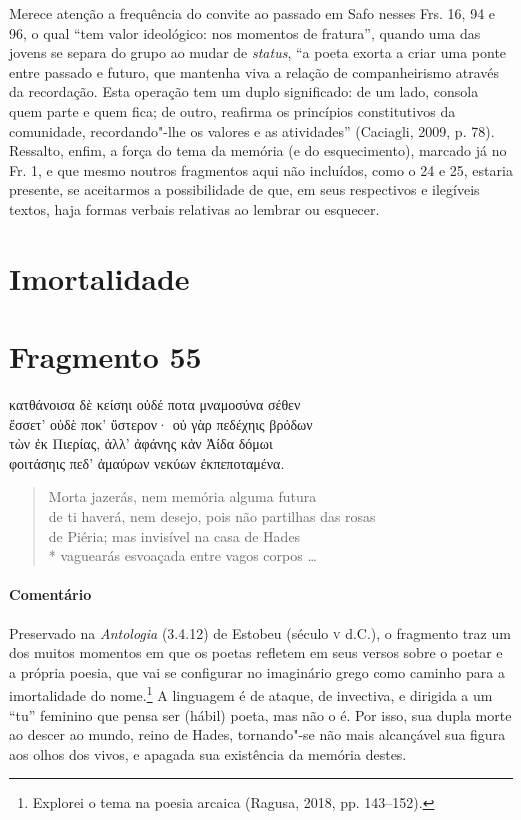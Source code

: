 {{Merece atenção a frequência do convite ao passado em Safo nesses Frs. 16, 94 e 96, o qual “tem valor ideológico: nos momentos de fratura”, quando uma das jovens se separa do grupo ao mudar de \textit{status}, “a poeta exorta a criar uma ponte entre passado e futuro, que mantenha viva a relação de companheirismo através da recordação. Esta operação tem um duplo significado: de um lado, consola quem parte e quem fica; de outro, reafirma os princípios constitutivos da comunidade, recordando"-lhe os valores e as atividades” (Caciagli, 2009, p. 78).
Ressalto, enfim, a força do tema da memória (e do esquecimento), marcado já no Fr. 1, e que mesmo noutros fragmentos aqui não incluídos, como o 24 e 25, estaria presente, se aceitarmos a possibilidade de que, em seus respectivos e ilegíveis textos, haja formas verbais relativas ao lembrar ou esquecer.
}





\pagebreak
\section{Imortalidade}
\section{Fragmento 55}

\begin{gkverse}
κατθάνοισα δὲ κείσηι οὐδέ ποτα μναμοσύνα σέθεν\\
ἔσσετ’ οὐδὲ \dagger{}ποκ’\dagger{} ὔστερον· οὐ γὰρ πεδέχηις βρόδων\\
τὼν ἐκ Πιερίας, ἀλλ’ ἀφάνης κἀν Ἀίδα δόμωι\\
φοιτάσηις πεδ’ ἀμαύρων νεκύων ἐκπεποταμένα.
\end{gkverse}

\begin{verse}
Morta jazerás, nem memória alguma futura\\
de ti haverá, nem desejo, pois não partilhas das rosas\\
de Piéria; mas invisível na casa de Hades\\*
vaguearás esvoaçada entre vagos corpos \ldots{}
\end{verse}

{\paragraph{Comentário} Preservado na \textit{Antologia} (3.4.12) de Estobeu (século \textsc{v} d.C.), o fragmento traz um dos muitos momentos em que os poetas refletem em seus versos
sobre o poetar e a própria poesia, que vai se configurar no imaginário grego
como caminho para a imortalidade do nome.\footnote{Explorei o tema na poesia arcaica (Ragusa, 2018, pp. 143--152).} A linguagem é de ataque, de
invectiva, e dirigida a um “tu” feminino que pensa ser (hábil) poeta, mas
não o é. Por isso, sua dupla morte ao descer ao mundo, reino de
Hades, tornando"-se não mais alcançável sua figura aos olhos dos vivos, e
apagada sua existência da memória destes.}



}
